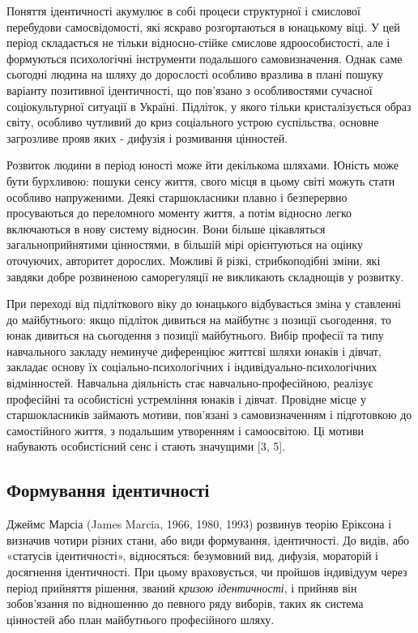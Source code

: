 \documentclass[a4paper,12pt, titlepage]{article}
\begin{document}
    Поняття ідентичності акумулює в собі процеси структурної і
    смислової перебудови самосвідомості, які яскраво розгортаються в
    юнацькому віці. У цей період складається не тільки відносно-стійке
    смислове ядро ​​особистості, але і формуються психологічні
    інструменти подальшого самовизначення. Однак саме сьогодні
    людина на шляху до дорослості особливо вразлива в плані пошуку варіанту позитивної
    ідентичності, що пов'язано з особливостями сучасної соціокультурної
    ситуації в Україні. Підліток, у якого тільки кристалізується образ
    світу, особливо чутливий до криз соціального устрою суспільства,
    основне загрозливе прояв яких - дифузія і розмивання
    цінностей.

    Розвиток людини в період юності може йти декількома шляхами.
    Юність може бути бурхливою: пошуки сенсу життя, свого місця в цьому світі
    можуть стати особливо напруженими. Деякі старшокласники плавно і
    безперервно просуваються до переломного моменту життя, а потім
    відносно легко включаються в нову систему відносин. Вони більше
    цікавляться загальноприйнятими цінностями, в більшій мірі
    орієнтуються на оцінку оточуючих, авторитет дорослих. Можливі й
    різкі, стрибкоподібні зміни, які завдяки добре розвиненою
    саморегуляції не викликають складнощів у розвитку.

    При переході від підліткового віку до юнацького відбувається
    зміна у ставленні до майбутнього: якщо підліток дивиться на майбутнє з
    позиції сьогодення, то юнак дивиться на сьогодення з позиції майбутнього.
    Вибір професії та типу навчального закладу неминуче диференціює
    життєві шляхи юнаків і дівчат, закладає основу їх соціально-психологічних
    і індивідуально-психологічних відмінностей. Навчальна
    діяльність стає навчально-професійною, реалізує
    професійні та особистісні устремління юнаків і дівчат. Провідне
    місце у старшокласників займають мотиви, пов'язані з самовизначенням
    і підготовкою до самостійного життя, з подальшим утворенням і
    самоосвітою. Ці мотиви набувають особистісний сенс і
    стають значущими [3, 5].

    \subsection{Формування ідентичності}
    Джеймс Марсіа (James Marcia, 1966, 1980, 1993) розвинув теорію
    Еріксона і визначив чотири різних стани, або види формування,
    ідентичності. До видів, або «статусів ідентичності», відносяться:
    безумовний вид, дифузія, мораторій і досягнення ідентичності. При
    цьому враховується, чи пройшов індивідуум через період прийняття рішення,
    званий \textit{кризою ідентичності}, і прийняв він зобов'язання по
    відношенню до певного ряду виборів, таких як система цінностей або
    план майбутнього професійного шляху.
\end{document}
